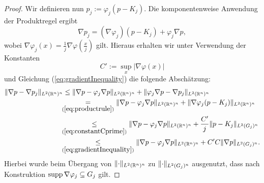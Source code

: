 \begin{proof}
  Wir definieren nun $p_j := \varphi_j (p - K_j)$.
  Die komponentenweise Anwendung der Produktregel ergibt 
  \begin{equation}
    \label{eq:productrule}
    \nabla p_j =  (\nabla \varphi_j)(p - K_j) + \varphi_j \nabla p,
  \end{equation}
  wobei $\nabla \varphi_j(x) = \frac{1}{j} \nabla \varphi (\frac{x}{j})$ gilt.
  Hieraus erhalten wir unter Verwendung der Konstanten 
  \begin{equation}
    \label{eq:constantCprime}
    C' := \sup_x |\nabla \varphi(x)|
  \end{equation}
  und Gleichung (\ref{eq:gradientInequality}) die folgende Abschätzung:
  \begin{align}
    \norm{\nabla p - \nabla p_j}_{L^2(\R^n)^n}
    &\leq \norm{\nabla p - \varphi_j \nabla p}_{L^2(\R^n)^n} + \norm{\varphi_j \nabla p - \nabla p_j}_{L^2(\R^n)^n} \nonumber\\
    &\hspace{-0.15cm}\underset{(\ref{eq:productrule})}{=} \norm{\nabla p - \varphi_j \nabla p}_{L^2(\R^n)^n}    + \norm{\nabla\varphi_j (p - K_j)}_{L^2(\R^n)^n} \nonumber\\
    &\hspace{-0.15cm}\underset{(\ref{eq:constantCprime})}{\leq} \norm{\nabla p - \varphi_j \nabla p}_{L^2(\R^n)^n} + \frac{C'}{j} \norm{p - K_j}_{L^2(G_j)^n}\nonumber\\
    &\hspace{-0.15cm}\underset{(\ref{eq:gradientInequality})}\leq \norm{\nabla p - \varphi_j \nabla p}_{L^2(\R^n)^n} + C'C \norm{\nabla p}_{L^2(G_j)^n} \label{eq:gradDiff}.
  \end{align}
  Hierbei wurde beim Übergang von $\lVert \cdot \rVert_{L^2(\mathbb{R}^n)^n}$ zu $\lVert \cdot \rVert_{L^2(G_j)^n}$ ausgenutzt, dass nach Konstruktion $\operatorname{supp} \nabla \varphi_j \subseteq G_j$ gilt.


\end{proof}
